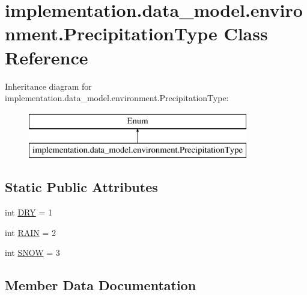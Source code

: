 \hypertarget{classimplementation_1_1data__model_1_1environment_1_1_precipitation_type}{}\section{implementation.\+data\+\_\+model.\+environment.\+Precipitation\+Type Class Reference}
\label{classimplementation_1_1data__model_1_1environment_1_1_precipitation_type}
Inheritance diagram for implementation.\+data\+\_\+model.\+environment.\+Precipitation\+Type\+:\begin{figure}[H]
\begin{center}
\leavevmode
\includegraphics[height=2.000000cm]{classimplementation_1_1data__model_1_1environment_1_1_precipitation_type}
\end{center}
\end{figure}
\subsection*{Static Public Attributes}
\begin{DoxyCompactItemize}
\item 
int \hyperlink{classimplementation_1_1data__model_1_1environment_1_1_precipitation_type_aa14685436950d0d597c4ae4aadface46}{D\+RY} = 1
\item 
int \hyperlink{classimplementation_1_1data__model_1_1environment_1_1_precipitation_type_afcb84c05898e8352c797abc81ee5f4e3}{R\+A\+IN} = 2
\item 
int \hyperlink{classimplementation_1_1data__model_1_1environment_1_1_precipitation_type_ab4becec45f8343c5a423e8728a278cd0}{S\+N\+OW} = 3
\end{DoxyCompactItemize}


\subsection{Member Data Documentation}
\mbox{\label{classimplementation_1_1data__model_1_1environment_1_1_precipitation_type_aa14685436950d0d597c4ae4aadface46}} 
